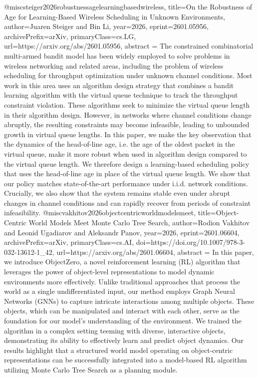{}@misc{steiger2026robustnessagelearningbasedwireless,
      title={On the Robustness of Age for Learning-Based Wireless Scheduling in Unknown Environments}, 
      author={Juaren Steiger and Bin Li},
      year={2026},
      eprint={2601.05956},
      archivePrefix={arXiv},
      primaryClass={cs.LG},
      url={https://arxiv.org/abs/2601.05956},
      abstract = {The constrained combinatorial multi-armed bandit model has been widely employed to solve problems in wireless networking and related areas, including the problem of wireless scheduling for throughput optimization under unknown channel conditions. Most work in this area uses an algorithm design strategy that combines a bandit learning algorithm with the virtual queue technique to track the throughput constraint violation. These algorithms seek to minimize the virtual queue length in their algorithm design. However, in networks where channel conditions change abruptly, the resulting constraints may become infeasible, leading to unbounded growth in virtual queue lengths. In this paper, we make the key observation that the dynamics of the head-of-line age, i.e. the age of the oldest packet in the virtual queue, make it more robust when used in algorithm design compared to the virtual queue length. We therefore design a learning-based scheduling policy that uses the head-of-line age in place of the virtual queue length. We show that our policy matches state-of-the-art performance under i.i.d. network conditions. Crucially, we also show that the system remains stable even under abrupt changes in channel conditions and can rapidly recover from periods of constraint infeasibility.}
}@misc{vakhitov2026objectcentricworldmodelsmeet,
      title={Object-Centric World Models Meet Monte Carlo Tree Search}, 
      author={Rodion Vakhitov and Leonid Ugadiarov and Aleksandr Panov},
      year={2026},
      eprint={2601.06604},
      archivePrefix={arXiv},
      primaryClass={cs.AI},
      doi={https://doi.org/10.1007/978-3-032-13612-1_42},
      url={https://arxiv.org/abs/2601.06604},
      abstract = {In this paper, we introduce ObjectZero, a novel reinforcement learning (RL) algorithm that leverages the power of object-level representations to model dynamic environments more effectively. Unlike traditional approaches that process the world as a single undifferentiated input, our method employs Graph Neural Networks (GNNs) to capture intricate interactions among multiple objects. These objects, which can be manipulated and interact with each other, serve as the foundation for our model's understanding of the environment. We trained the algorithm in a complex setting teeming with diverse, interactive objects, demonstrating its ability to effectively learn and predict object dynamics. Our results highlight that a structured world model operating on object-centric representations can be successfully integrated into a model-based RL algorithm utilizing Monte Carlo Tree Search as a planning module.}
}
